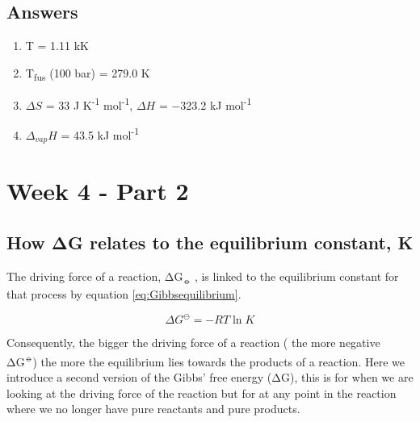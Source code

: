 \documentclass[
]{book}
\begin{document}
\hypertarget{sec:w4p1answer}{%
\section{Answers}\label{sec:w4p1answer}}

\begin{enumerate}
\def\labelenumi{\arabic{enumi}.}
\item
  T = 1.11 kK
\item
  T\textsubscript{fus} (100 bar) = 279.0 K
\item
  \(\Delta S\) = 33 J K\textsuperscript{-1} mol\textsuperscript{-1}, \(\Delta H\) = −323.2 kJ mol\textsuperscript{-1}
\item
  \(\Delta_{vap} H\) = 43.5 kJ mol\textsuperscript{-1}
\end{enumerate}

\hypertarget{ch:Part8}{%
\chapter{Week 4 - Part 2}\label{ch:Part8}}

\hypertarget{how-ux3b4g-relates-to-the-equilibrium-constant-k}{%
\section{How ΔG relates to the equilibrium constant, K}\label{how-ux3b4g-relates-to-the-equilibrium-constant-k}}

The driving force of a reaction, ΔG\textsubscript{⦵} , is linked to the equilibrium constant for that process by equation \eqref{eq:Gibbsequilibrium}.

\begin{equation}
\Delta G^\ominus = -RT \ln K
\label{eq:Gibbsequilibrium}
\end{equation}

Consequently, the bigger the driving force of a reaction ( the more negative ΔG\textsuperscript{⦵}) the more the equilibrium lies towards the products of a reaction. Here we introduce a second version of the Gibbs' free energy (ΔG), this is for when we are looking at the driving force of the reaction but for at any point in the reaction where we no longer have pure reactants and pure products.
\end{document}
